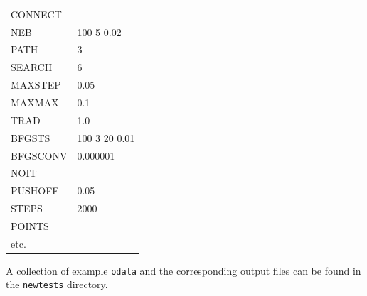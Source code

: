 \documentclass[12pt,a4paper,dvips]{article}
\begin{document}
\medskip
\begin{tabular}{ll}
CONNECT & \\
NEB     &  100 5 0.02 \\
PATH    &  3 \\
SEARCH & 6 \\
MAXSTEP & 0.05 \\
MAXMAX  & 0.1 \\
TRAD & 1.0 \\
BFGSTS  & 100 3 20 0.01  \\
BFGSCONV & 0.000001 \\
NOIT & \\
PUSHOFF & 0.05 \\
STEPS   &  2000 \\
POINTS & \\
etc. & \\
\end{tabular}

\noindent A collection of example {\tt odata} and the corresponding output files can be
found in the {\tt newtests} directory.

\cleardoublepage
{}
{}




\end{document}
